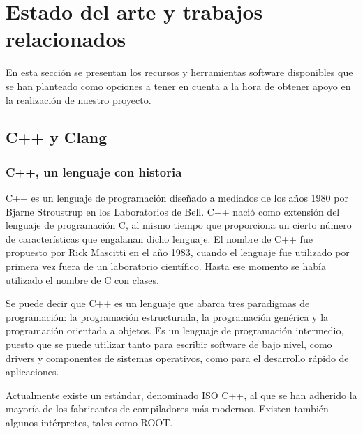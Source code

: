 \section{Estado del arte y trabajos relacionados}
\label{cap1:sec:estytra}

En esta secci\'on se presentan los recursos y herramientas software disponibles que se han planteado como opciones a tener en cuenta a la hora de obtener apoyo en la realizaci\'on de nuestro proyecto.

\subsection{C++ y Clang}
\label{ap2:sec:c++yclang}

\subsubsection*{C++, un lenguaje con historia}
\label{ap2:sec:c++}

C++ es un lenguaje de programaci\'on dise\~nado a mediados de los a\~nos 1980 por Bjarne Stroustrup en los Laboratorios de Bell. C++ naci\'o como extensi\'on del lenguaje de programaci\'on C, al mismo tiempo que proporciona un cierto n\'umero de caracter\'isticas que engalanan dicho lenguaje. El nombre de C++ fue propuesto por Rick Mascitti en el a\~no 1983, cuando el lenguaje fue utilizado por primera vez fuera de un laboratorio cient\'ifico. Hasta ese momento se hab\'ia utilizado el nombre de C con clases. 

Se puede decir que C++ es un lenguaje que abarca tres paradigmas de programaci\'on: la programaci\'on estructurada, la programaci\'on gen\'erica y la programaci\'on orientada a objetos. Es un lenguaje de programaci\'on intermedio, puesto que se puede utilizar tanto para escribir software de bajo nivel, como drivers y componentes de sistemas operativos, como para el desarrollo r\'apido de aplicaciones.

Actualmente existe un est\'andar, denominado ISO C++, al que se han adherido la mayor\'ia de los fabricantes de compiladores m\'as modernos. Existen tambi\'en algunos int\'erpretes, tales como ROOT.

